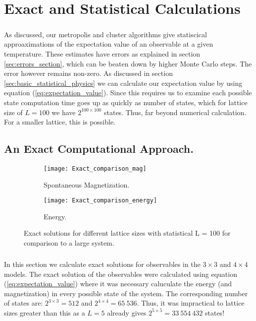 \documentclass[12pt] {report} %
\begin{document}
				
			
	\chapter{Exact and Statistical Calculations}		\label{chapter:testing_algorithms}
	
		\paragraph{}
			As discussed, our metropolis and cluster algorithms give statiscical approaximations of the expectation value of an observable at a given temperature. These estimates have errors as explained in section \ref{sec:errors_section}, which can be beaten down by higher Monte Carlo steps. The error however remains non-zero. As discussed in section \ref{sec:basic_statistical_physics} we can calculate our expectation value by using equation (\ref{eq:expectation_value}). Since this requires us to examine each possible state computation time goes up as quickly as number of states, which for lattice size of $L = 100$ we have $2^{100 \times 100}$ states. Thus, far beyond numerical calculation. For a smaller lattice, this is possible.
				 
		\section{An Exact Computational Approach.}

				\begin{figure}[h]
					\centering
					\begin{subfigure}[h]{0.49\textwidth}
					\centering
						\texttt{[image: Exact\_comparison\_mag]}
						\caption{Spontaneous Magnetization.}
						\label{fig:Exact_comparison_mag}
					\end{subfigure}
					\hfill
					\begin{subfigure}[h]{0.49\textwidth}
						\centering
							\texttt{[image: Exact\_comparison\_energy]}
							\caption{Energy.}
							\label{fig:Exact_comparison_energy}
					\end{subfigure} 
					\caption{Exact solutions for different lattice sizes with statistical L = 100 for comparison to a large system.}
					\label{fig:Exact_comparisons}
				\end{figure}
				
			\paragraph{}
 				In this section we calculate exact solutions for observables in the $3 \times 3$ and $4 \times 4$ models. The exact solution of the observables were calculated using equation (\ref{eq:expectation_value}) where it was necessary caluculate the energy (and magnetization) in every possible state of the system. The corresponding number of states are: $2^{3 \times 3} = 512$ and $2^{4 \times 4} = 65\:536$. Thus, it was impractical to lattice sizes greater than this as a $L=5$ already gives $2^{5 \times 5} = 33 \:554\:432$ states!
 				
\end{document}
